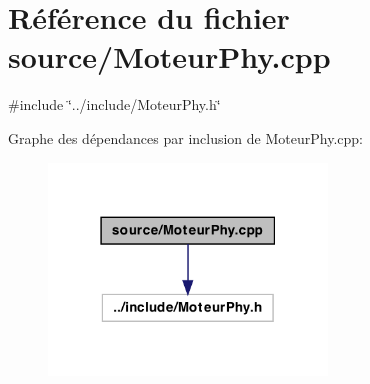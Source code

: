\hypertarget{a00006}{
\section{Référence du fichier source/MoteurPhy.cpp}
\label{a00006}
}
{\ttfamily \#include \char`\"{}../include/MoteurPhy.h\char`\"{}}\par
Graphe des dépendances par inclusion de MoteurPhy.cpp:
\nopagebreak
\begin{figure}[H]
\begin{center}
\leavevmode
\includegraphics[width=210pt]{a00013}
\end{center}
\end{figure}
